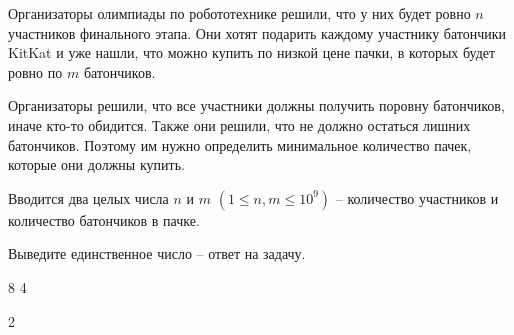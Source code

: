 
Организаторы олимпиады по робототехнике решили, что у них будет ровно $n$ участников финального этапа. Они хотят подарить каждому участнику батончики KitKat и уже нашли, что можно купить по низкой цене пачки, в которых будет ровно по $m$ батончиков.

Организаторы решили, что все участники должны получить поровну батончиков, иначе кто-то обидится. Также они решили, что не должно остаться лишних батончиков. Поэтому им нужно определить минимальное количество пачек, которые они должны купить.


Вводится два целых числа $n$ и $m$ $(1 \le n, m \le 10^{9})$ -- количество участников и количество батончиков в пачке.

\outputfmtSection

Выведите единственное число -- ответ на задачу.

\exampleSection


\begin{myverbbox}[\small]{\vinput}
8 4
\end{myverbbox}
\begin{myverbbox}[\small]{\voutput}
2
\end{myverbbox}

